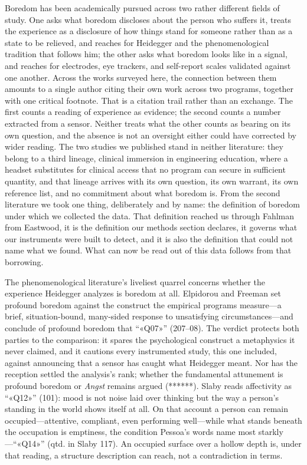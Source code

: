Boredom has been academically pursued across two rather different fields of study. One asks
what boredom discloses about the person who suffers it, treats the experience as a disclosure
of how things stand for someone rather than as a state to be relieved, and reaches for
Heidegger and the phenomenological tradition that follows him; the other asks what boredom
looks like in a signal, and reaches for electrodes, eye trackers, and self-report scales
validated against one another. Across the works surveyed here, the connection between them
amounts to a single author citing their own work across two programs, together with one
critical footnote. That is a citation trail rather than an exchange. The first counts a
reading of experience as evidence; the second counts a number extracted from a sensor.
Neither treats what the other counts as bearing on its own question, and the absence is not an
oversight either could have corrected by wider reading. The two studies we published stand in
neither literature: they belong to a third lineage, clinical immersion in engineering
education, where a headset substitutes for clinical access that no program can secure in
sufficient quantity, and that lineage arrives with its own question, its own warrant, its own
reference list, and no commitment about what boredom is. From the second literature we took
one thing, deliberately and by name: the definition of boredom under which we collected the
data. That definition reached us through Fahlman from Eastwood, it is the definition our
methods section declares, it governs what our instruments were built to detect, and it is also
the definition that could not name what we found. What can now be read out of this data
follows from that borrowing.

The phenomenological literature's liveliest quarrel concerns whether the experience Heidegger
analyzes is boredom at all. Elpidorou and Freeman set profound boredom against the construct
the empirical programs measure---a brief, situation-bound, many-sided response to
unsatisfying circumstances---and conclude of profound boredom that ``«Q07»'' (207--08). The
verdict protects both parties to the comparison: it spares the psychological construct a
metaphysics it never claimed, and it cautions every instrumented study, this one included,
against announcing that a sensor has caught what Heidegger meant. Nor has the reception
settled the analysis's rank; whether the fundamental attunement is profound boredom or
\textit{Angst} remains argued (******). Slaby reads affectivity as ``«Q12»'' (101): mood is
not noise laid over thinking but the way a person's standing in the world shows itself at
all. On that account a person can remain occupied---attentive, compliant, even performing
well---while what stands beneath the occupation is emptiness, the condition Pessoa's words
name most starkly---``«Q14»'' (qtd. in Slaby 117). An occupied surface over a hollow depth
is, under that reading, a structure description can reach, not a contradiction in terms.

